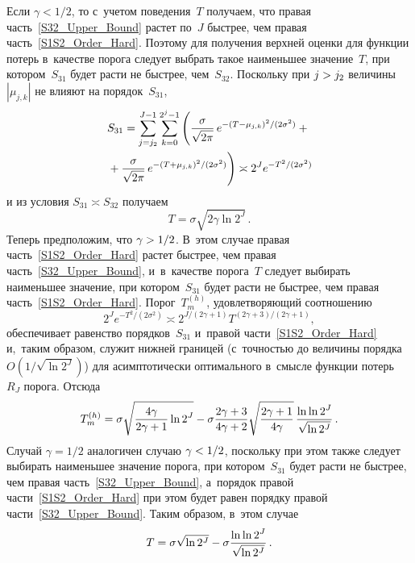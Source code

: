\begin{multicols}{2}
Если $\gamma<1/2$, то с~учетом поведения~$T$ получаем, что правая часть~\eqref{S32_Upper_Bound}
растет по~$J$ быст\-рее, чем правая часть~\eqref{S1S2_Order_Hard}. 
Поэтому для получения верх\-ней оценки для функции потерь в~качестве порога 
следует выбрать такое наименьшее значение~$T$, при котором~$S_{31}$ будет рас\-ти не быст\-рее, 
чем~$S_{32}$. Поскольку при $j\hm>j_2$ величины~$|\mu_{j,k}|$ не влияют на порядок~$S_{31}$,
\begin{multline*}
S_{31}=\sum\limits_{j=j_2}^{J-1}\sum\limits_{k=0}^{2^j-1}\left(
\displaystyle\frac{\displaystyle \sigma\mathstrut}{\displaystyle \sqrt{2\pi}\mathstrut} \,e^{-{(T-\mu_{j,k})^2}/({2\sigma^2})}+{}\right.\\
\left.{}+
\displaystyle\frac{\displaystyle \sigma\mathstrut}{\displaystyle \sqrt{2\pi}\mathstrut}\,e^{-(T+\mu_{j,k})^2/({2\sigma^2})}\right)
\asymp2^{J}e^{-{T^2}/({2\sigma^2})}
\end{multline*}
и из условия $S_{31}\asymp S_{32}$ получаем 
$$
T =\sigma\sqrt{2\gamma\ln2^J}\,.
$$
Теперь предположим, что $\gamma\hm>1/2$. В~этом случае правая часть~\eqref{S1S2_Order_Hard} 
растет быст\-рее, чем правая часть~\eqref{S32_Upper_Bound}, и~в~качестве порога~$T$ 
следует выбирать наименьшее значение, при котором~$S_{31}$ будет рас\-ти не быстрее, чем правая 
часть~\eqref{S1S2_Order_Hard}. Порог~$T_m^{(h)}$, удовле\-тво\-ря\-ющий соотношению
\begin{equation*}
2^{J}e^{-{T^2}/({2\sigma^2})} \asymp 2^{{J}/({2\gamma+1})}T^{({2\gamma+3})/({2\gamma+1})},
\end{equation*}
обеспечивает равенство порядков~$S_{31}$ и~правой час\-ти~\eqref{S1S2_Order_Hard} 
и,~таким образом, служит ниж\-ней границей (с~точ\-ностью до величины порядка $O(1/\sqrt{\ln 2^J})$) 
для асимп\-то\-ти\-че\-ски оптимального в~смыс\-ле функции потерь~$R_J$ порога. Отсюда
$$
T_m^{(h)}=\sigma\sqrt{\displaystyle\frac{\displaystyle 4\gamma\mathstrut}{\displaystyle 2\gamma+1\mathstrut}\ln2^J}-\sigma\displaystyle\frac{\displaystyle 2\gamma+3\mathstrut}{\displaystyle 4\gamma+2\mathstrut}
\sqrt{\displaystyle\frac{\displaystyle 2\gamma+1\mathstrut}{\displaystyle 4\gamma\mathstrut}}\,\displaystyle\frac{\displaystyle \ln\ln2^J\mathstrut}{\displaystyle \sqrt{\ln2^J}\mathstrut}\,.
$$
Случай $\gamma=1/2$ аналогичен случаю $\gamma\hm<1/2$, поскольку при этом так\-же 
следует выбирать наименьшее значение порога, при котором~$S_{31}$ будет рас\-ти не быст\-рее, чем правая 
часть~\eqref{S32_Upper_Bound}, а~порядок правой час\-ти~\eqref{S1S2_Order_Hard} 
при этом будет равен порядку правой части~\eqref{S32_Upper_Bound}. Таким образом, в~этом случае
$$
T =\sigma\sqrt{\ln2^J}-\sigma\displaystyle\frac{\displaystyle \ln\ln2^J\mathstrut}{\displaystyle \sqrt{\ln2^J}\mathstrut}\,.
$$


\end{multicols}
